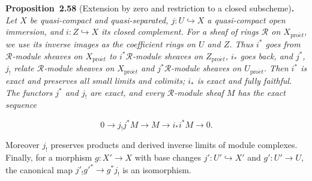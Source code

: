 \documentclass[11pt]{article}
\newenvironment{bpstatement}[2]{\par\addvspace{0.6\baselineskip}\noindent\textbf{#1}#2\textbf{.}\enspace\ignorespaces}
  {\par\addvspace{0.4\baselineskip}}
\newenvironment{bpstatementit}[2]{\begin{bpstatement}{#1}{#2}\itshape\ignorespaces}{\end{bpstatement}}
\begin{document}
\label{bp179}%
\begin{bpstatementit}{Proposition~2.58}{ (Extension by zero and restriction to a closed subscheme)}
Let \(X\) be quasi-compact and quasi-separated, \(j:U\hookrightarrow X\) a quasi-compact open immersion, and \(i:Z\hookrightarrow X\) its closed complement. For a sheaf of rings \(\mathcal R\) on \(X_{\mathrm{pro}\acute{e}t}\), we use its inverse images as the coefficient rings on \(U\) and \(Z\). Thus \(i^*\) goes from \(\mathcal R\)-module sheaves on \(X_{\mathrm{pro}\acute{e}t}\) to \(i^*\mathcal R\)-module sheaves on \(Z_{\mathrm{pro}\acute{e}t}\), \(i_*\) goes back, and \(j^*\), \(j_!\) relate \(\mathcal R\)-module sheaves on \(X_{\mathrm{pro}\acute{e}t}\) and \(j^*\mathcal R\)-module sheaves on \(U_{\mathrm{pro}\acute{e}t}\). Then \(i^*\) is exact and preserves all small limits and colimits; \(i_*\) is exact and fully faithful. The functors \(j^*\) and \(j_!\) are exact, and every \(\mathcal R\)-module sheaf \(M\) has the exact sequence

\[
0\longrightarrow j_!j^*M\longrightarrow M
\longrightarrow i_*i^*M\longrightarrow0.
\]

Moreover \(j_!\) preserves products and derived inverse limits of module complexes. Finally, for a morphism \(g:X'\to X\) with base changes \(j':U'\hookrightarrow X'\) and \(g':U'\to U\), the canonical map \(j'_!g'^*\to g^*j_!\) is an isomorphism.
\end{bpstatementit}
\end{document}
